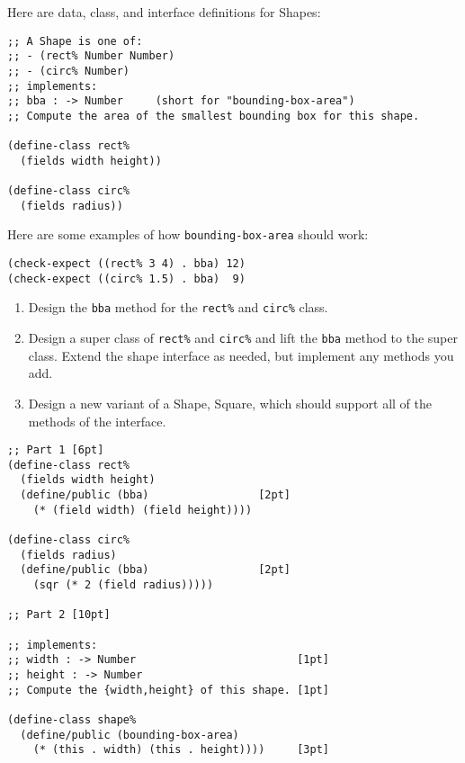 \documentclass[12pt]{article}                   %
\def\pts#1{\marginpar{\footnotesize \raggedright  \fbox{#1 {\sc Points}}}}
\newenvironment{solution}{}{}
\newcommand\code[1]{\texttt{#1}}
\begin{document}
\begin{problem}\pts{20}

Here are data, class, and interface definitions for Shapes:
\begin{verbatim}
;; A Shape is one of:
;; - (rect% Number Number)
;; - (circ% Number)
;; implements:
;; bba : -> Number     (short for "bounding-box-area")
;; Compute the area of the smallest bounding box for this shape.

(define-class rect%
  (fields width height))

(define-class circ%
  (fields radius))
\end{verbatim}
%
Here are some examples of how \code{bounding-box-area} should work:
\begin{verbatim}
(check-expect ((rect% 3 4) . bba) 12)
(check-expect ((circ% 1.5) . bba)  9)
\end{verbatim}


\begin{enumerate}
\item Design the \code{bba} method for the
  \code{rect\%} and \code{circ\%} class.

\item Design a super class of \code{rect\%} and \code{circ\%} and
  lift the \code{bba} method to the super class.  Extend
  the shape interface as needed, but implement any methods you add.

\item Design a new variant of a Shape, Square, which should support
  all of the methods of the interface.
\end{enumerate}

\begin{solution}
\begin{verbatim}
;; Part 1 [6pt]
(define-class rect% 
  (fields width height)                
  (define/public (bba)                 [2pt]
    (* (field width) (field height))))
  
(define-class circ% 
  (fields radius)                      
  (define/public (bba)                 [2pt]
    (sqr (* 2 (field radius)))))

;; Part 2 [10pt]

;; implements:
;; width : -> Number                         [1pt]
;; height : -> Number
;; Compute the {width,height} of this shape. [1pt]

(define-class shape% 
  (define/public (bounding-box-area)
    (* (this . width) (this . height))))     [3pt]


\end{verbatim}
\end{solution}
\end{problem}
\end{document}
